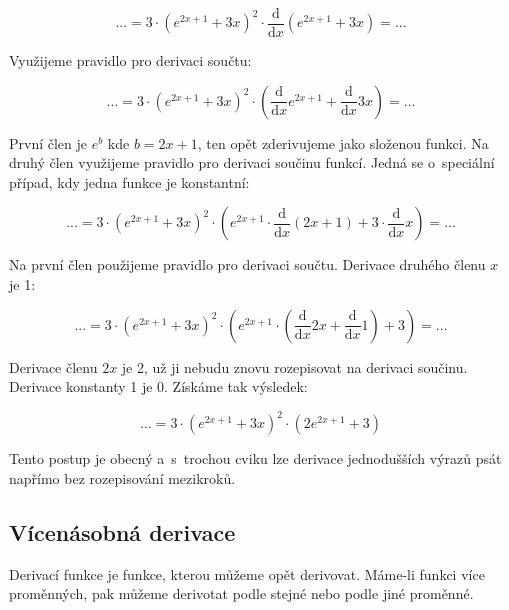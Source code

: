\begin{equation}
... = 3 \cdot \left(e^{2x+1} + 3x \right)^2 \cdot \frac{\mathrm{d}}{\mathrm{d}x} \left(e^{2x+1} + 3x \right) = ...
\end{equation}

Využijeme pravidlo pro derivaci součtu:

\begin{equation}
... = 3 \cdot \left(e^{2x+1} + 3x \right)^2 \cdot \left(\frac{\mathrm{d}}{\mathrm{d}x} e^{2x+1} + \frac{\mathrm{d}}{\mathrm{d}x} 3x \right) = ...
\end{equation}

První člen je \(e^b\) kde \(b = 2x + 1\), ten opět zderivujeme jako složenou funkci. Na druhý člen využijeme pravidlo pro derivaci součinu funkcí. Jedná se o~speciální případ, kdy jedna funkce je konstantní:

\begin{equation}
... = 3 \cdot \left(e^{2x+1} + 3x \right)^2 \cdot \left(e^{2x+1} \cdot \frac{\mathrm{d}}{\mathrm{d}x} \left(2x+1\right) + 3 \cdot \frac{\mathrm{d}}{\mathrm{d}x} x \right) = ...
\end{equation}

Na první člen použijeme pravidlo pro derivaci součtu. Derivace druhého členu \(x\) je 1:

\begin{equation}
... = 3 \cdot \left(e^{2x+1} + 3x \right)^2 \cdot \left(e^{2x+1} \cdot \left(\frac{\mathrm{d}}{\mathrm{d}x} 2x + \frac{\mathrm{d}}{\mathrm{d}x} 1\right) + 3 \right) = ...
\end{equation}

Derivace členu \(2x\) je 2, už ji nebudu znovu rozepisovat na derivaci součinu. Derivace konstanty 1 je 0. Získáme tak výsledek:

\begin{equation}
... = 3 \cdot \left(e^{2x+1} + 3x \right)^2 \cdot \left(2 e^{2x+1} + 3 \right)
\end{equation}

Tento postup je obecný a~s~trochou cviku lze derivace jednodušších výrazů psát napřímo bez rozepisování mezikroků. 

\subsection{Vícenásobná derivace}

Derivací funkce je funkce, kterou můžeme opět derivovat. Máme-li funkci více proměnných, pak můžeme derivotat podle stejné nebo podle jiné proměnné.

